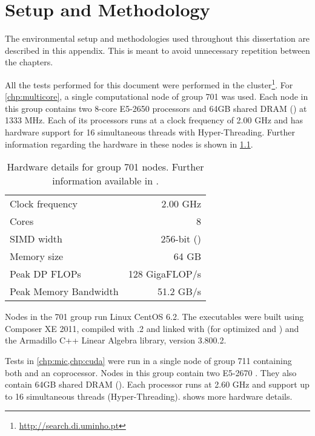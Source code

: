 \documentclass[../thesis]{subfiles}
\begin{document}
	\chapter{Setup and Methodology}
	\label{chp:appendix:setup}

	The environmental setup and methodologies used throughout this dissertation are described in this appendix. This is meant to avoid unnecessary repetition between the chapters.

	All the tests performed for this document were performed in the \search cluster\footnote{\url{http://search.di.uminho.pt}}. For \cref{chp:multicore}, a single computational node of group 701 was used. Each node in this group contains two 8-core \intel\xeon E5-2650 processors and 64GB shared DRAM (\numa) at 1333 MHz. Each of its processors runs at a clock frequency of 2.00 GHz and has hardware support for 16 simultaneous threads with \intel Hyper-Threading. Further information regarding the hardware in these nodes is shown in \cref{tab:search:701}.

	\begin{table}[p]
		\begin{center}
			\begin{tabular}{lr}
				\hline
				Clock frequency & 2.00 GHz \\
				Cores & 8 \\
				SIMD width & 256-bit (\avx) \\
				Memory size & 64 GB \\
				\hline
				Peak DP FLOPs & 128 GigaFLOP/s \\
				Peak Memory Bandwidth & 51.2 GB/s \\ 
				\hline
			\end{tabular}
		\end{center}
		\caption{Hardware details for \search group 701 nodes. Further information available in \cite{Intel:Xeon:e5_2650,Intel:Xeon:e5_2600}.}
		\label{tab:search:701}
	\end{table}

	Nodes in the 701 group run Linux CentOS 6.2. The executables were built using \intel Composer XE 2011, compiled with .2 and linked with \intel\mkl (for optimized \blas and \lapack) and the Armadillo C++ Linear Algebra library, version 3.800.2.

	Tests in \cref{chp:mic,chp:cuda} were run in a single node of group 711 containing both \gpus and an \intel\xeonphi coprocessor. Nodes in this group contain two \intel\xeon E5-2670 \cpus. They also contain 64GB shared DRAM (\numa). Each processor runs at 2.60 GHz and support up to 16 simultaneous threads (Hyper-Threading).  shows more hardware details.
\end{document}

